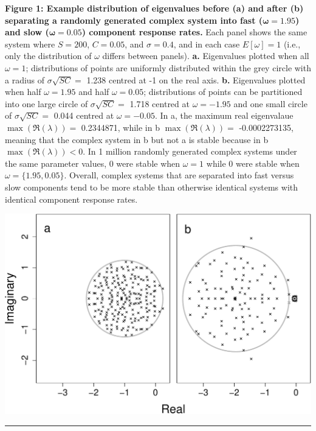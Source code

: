 \documentclass[]{article}
\begin{document}
\textbf{Figure 1: Example distribution of eigenvalues before (a) and
after (b) separating a randomly generated complex system into fast
(\(\boldsymbol{\omega} = 1.95\)) and slow
(\(\boldsymbol{\omega} = 0.05\)) component response rates.} Each panel
shows the same system where \(S = 200\), \(C = 0.05\), and
\(\sigma = 0.4\), and in each case \(E[\omega] = 1\) (i.e., only the
distribution of \(\omega\) differs between panels). \textbf{a.}
Eigenvalues plotted when all \(\omega = 1\); distributions of points are
uniformly distributed within the grey circle with a radius of
\(\sigma\sqrt{SC} =\) 1.238 centred at -1 on the real axis. \textbf{b.}
Eigenvalues plotted when half \(\omega = 1.95\) and half
\(\omega = 0.05\); distributions of points can be partitioned into one
large circle of \(\sigma\sqrt{SC} =\) 1.718 centred at
\(\omega = -1.95\) and one small circle of \(\sigma\sqrt{SC} =\) 0.044
centred at \(\omega = -0.05\). In a, the maximum real eigenvalaue
\(\max\left(\Re(\lambda)\right) =\) 0.2344871, while in b
\(\max\left(\Re(\lambda)\right) =\) -0.0002273135, meaning that the
complex system in b but not a is stable because in b
\(\max\left(\Re(\lambda)\right) < 0\). In 1 million randomly generated
complex systems under the same parameter values, 0 were stable when
\(\omega = 1\) while 0 were stable when \(\omega = \{1.95, 0.05\}\).
Overall, complex systems that are separated into fast versus slow
components tend to be more stable than otherwise identical systems with
identical component response rates.

\includegraphics{ms_files/figure-latex/unnamed-chunk-6-1.pdf}

\begin{center}\rule{0.5\linewidth}{\linethickness}\end{center}
\end{document}
